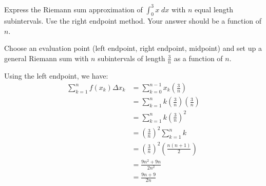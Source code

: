 \documentclass{ximera}
\author{Emma Smith Zbarsky}
\begin{document}
\begin{exercise}

Express the Riemann sum approximation of $\int_0^3 x \; dx$ with $n$
equal length subintervals. Use the right endpoint method. Your answer
should be a function of $n$.


\begin{hint}
Choose an evaluation point (left endpoint, right endpoint, midpoint) and
set up a general Riemann sum with $n$ subintervals of length
$\frac{3}{n}$ as a function of $n$.
\end{hint}


\begin{hint}
Using the left endpoint, we have: \begin{align*}
\sum_{k=1}^{n} f(x_k) \Delta x_k &= \sum_{k=0}^{n-1} x_k\left(\frac{3}{n}\right) \\
&= \sum_{k=1}^{n} k\left(\frac{3}{n}\right)\left(\frac{3}{n}\right) \\
 &=  \sum_{k=1}^{n} k\left(\frac{3}{n}\right)^2\\ 
&= \left(\frac{3}{n}\right)^2 \sum_{k=1}^{n} k \\
&=  \left(\frac{3}{n}\right)^2 \left(\frac{n(n+1)}{2}\right) \\
&= \frac{9n^2+9n}{2n^2} \\
&= \frac{9n+9}{2n}
\end{align*}
\end{hint}


\begin{multipleChoice}
\end{multipleChoice}

\end{exercise}
\end{document}
